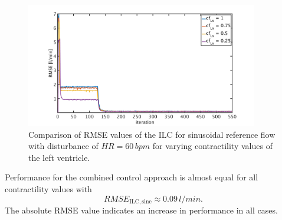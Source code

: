 \begin{figure}[ht!]
  \centering
  \includegraphics[width=0.9\textwidth]{images/chapt_5/ILC/RMSE_dist_sine_var_cf.pdf}
  \caption[RMSE Comparison of ILC at sinusoidal reference flow for varying left ventricular contractilities]{Comparison of RMSE values of the ILC for sinusoidal reference flow with disturbance of $HR=60\,bpm$ for varying contractility values of the left ventricle.}
  \label{fig:RMSE_dist_sine_var_cf}
\end{figure}
Performance for the combined control approach is almost equal for all contractility values with
\begin{equation}
  RMSE_{\mathrm{ILC,sine}}\approx 0.09\, l/min.
\end{equation}
The absolute RMSE value indicates an increase in performance in all cases.

